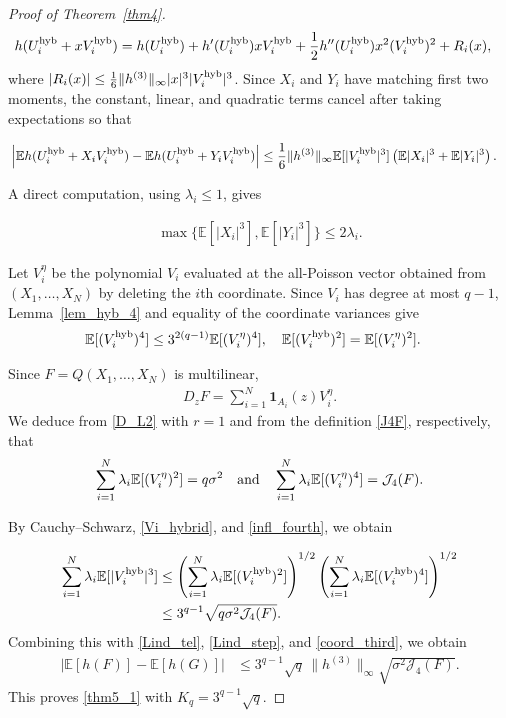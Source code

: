 \documentclass[letterpaper,11pt,reqno]{amsart}
\numberwithin{equation}{section}
\theoremstyle{plain}
\theoremstyle{definition}
\theoremstyle{remark}
\newcommand{\E}{\mathbb{E}}
\newcommand{\ind}{\mathbf{1}}
\newcommand{\noi}{\noindent}
\newcommand{\Jfour}{\mathcal J_4}
\newcommand{\AND}{\quad{\rm and}\quad}
\begin{document}
\begin{proof}[Proof of Theorem~\ref{thm4}]
\noi
\begin{align*}
 h(U_i^{\rm hyb}+xV_i^{\rm hyb})
 &=
 h(U_i^{\rm hyb})
 +h'(U_i^{\rm hyb})xV_i^{\rm hyb}
 +\frac12h''(U_i^{\rm hyb})x^2
 (V_i^{\rm hyb})^2
 +R_i(x),
\end{align*}
where
$|R_i(x)|\leq\frac16\|h^{(3)}\|_\infty
|x|^3|V_i^{\rm hyb}|^3$.
Since $X_i$ and $Y_i$ have matching first two moments, the constant,
linear, and quadratic terms cancel after taking expectations
so that

\noi
\begin{align}
 &\left|
 \E h(U_i^{\rm hyb}+X_iV_i^{\rm hyb})
 -
 \E h(U_i^{\rm hyb}+Y_iV_i^{\rm hyb})
 \right|
\leq
 \frac{1}{6} \| h^{(3)}\|_\infty
 \E[|V_i^{\rm hyb}|^3]
 \left(
 \E|X_i|^3+\E|Y_i|^3
 \right).
 \label{Lind_step}
\end{align}


A direct computation, using $\lambda_i\leq1$, gives

\noi
 \begin{align} \label{coord_third}
\max\{\E[|X_i|^3],\E[|Y_i|^3]\}\leq2\lambda_i.
\end{align}


Let $V_i^\eta$ be the polynomial $V_i$ evaluated at the all-Poisson
vector obtained from $(X_1,\ldots,X_N)$ by deleting the $i$th
coordinate.  Since $V_i$ has degree at most $q-1$, Lemma~\ref{lem_hyb_4}
and equality of the coordinate variances give
\noi
\begin{align}
 \E[(V_i^{\rm hyb})^4]
 &\leq3^{2(q-1)}\E[(V_i^\eta)^4],
 \quad
 \E[(V_i^{\rm hyb})^2]=\E[(V_i^\eta)^2].
 \label{Vi_hybrid}
\end{align}


Since $F=Q(X_1,\ldots,X_N)$ is multilinear,
\noi
\begin{align*}
 D_zF=\sum_{i=1}^N\ind_{A_i}(z)V_i^\eta.
\end{align*}
We deduce from \eqref{D_L2} with $r=1$ and from the definition
\eqref{J4F}, respectively, that
\noi
\begin{align}
 \sum_{i=1}^N\lambda_i\E[(V_i^\eta)^2]
 =q\sigma^2
 \AND
 \sum_{i=1}^N\lambda_i\E[(V_i^\eta)^4]
 =\Jfour(F).
 \label{infl_fourth}
\end{align}

By Cauchy--Schwarz, \eqref{Vi_hybrid}, and \eqref{infl_fourth},
we obtain

\noi
\begin{align*}
 \sum_{i=1}^N
 \lambda_i\E[|V_i^{\rm hyb}|^3]
 &\leq
 \left(
 \sum_{i=1}^N
 \lambda_i\E[(V_i^{\rm hyb})^2]
 \right)^{1/2}
 \left(
 \sum_{i=1}^N
 \lambda_i\E[(V_i^{\rm hyb})^4]
 \right)^{1/2}\\
 &\leq
 3^{q-1}
 \sqrt{q\sigma^2\Jfour(F)}.
\end{align*}
Combining this with
\eqref{Lind_tel}, \eqref{Lind_step}, and
\eqref{coord_third}, we obtain
\noi
\begin{align*}
 |\E[h(F)]-\E[h(G)]|
 &\leq
 3^{q-1}\sqrt q\,
 \|h^{(3)}\|_\infty
 \sqrt{\sigma^2\Jfour(F)}.
\end{align*}
This proves \eqref{thm5_1} with $K_q=3^{q-1}\sqrt q$.



\end{proof}
\end{document}
